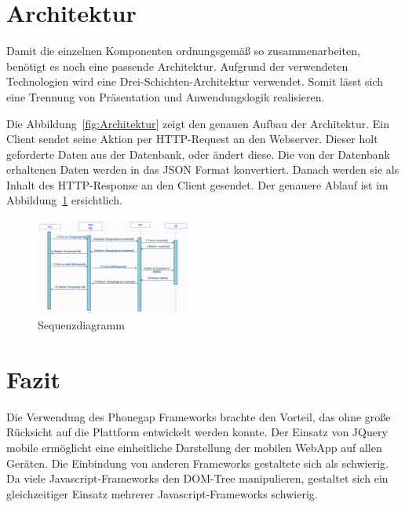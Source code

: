 \documentclass[10pt, conference, compsocconf]{IEEEtran}
\begin{document}
\section{Architektur}
{Damit die einzelnen Komponenten ordnungsgem\"a{\ss} so zusammenarbeiten, ben\"otigt es noch eine passende Architektur. Aufgrund der verwendeten Technologien wird eine Drei-Schichten-Architektur verwendet. Somit l\"asst sich eine Trennung von Pr\"asentation und Anwendungslogik realisieren.
	
Die Abbildung~\ref{fig:Architektur} zeigt den genauen Aufbau der Architektur. Ein Client sendet seine Aktion per HTTP-Request an den Webserver. Dieser holt geforderte Daten aus der Datenbank, oder \"andert diese. Die von der Datenbank erhaltenen Daten werden in das JSON Format konvertiert. Danach werden sie als Inhalt des HTTP-Response an den Client gesendet. Der genauere Ablauf ist im Abbildung~\ref{fig:Sequenzdiagramm} ersichtlich.

\begin{figure}[h!]
	\centering
	\includegraphics[width=0.45\textwidth]{./Bilder_Zeichnungen/Sequenzdiagramm.png}
	\caption{Sequenzdiagramm}
	\label{fig:Sequenzdiagramm}
\end{figure}

\section{Fazit}
Die Verwendung des Phonegap Frameworks brachte den Vorteil, das ohne gro{\ss}e R\"ucksicht auf die Plattform entwickelt werden konnte. 
Der Einsatz von JQuery mobile ermöglicht eine einheitliche Darstellung der mobilen WebApp auf allen Ger\"aten.
Die Einbindung von anderen Frameworks gestaltete sich als schwierig.
Da viele Javascript-Frameworks den DOM-Tree manipulieren, gestaltet sich ein gleichzeitiger Einsatz mehrerer Javascript-Frameworks schwierig.


}
\end{document}
